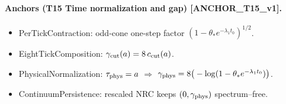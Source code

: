 \documentclass[11pt]{amsart}
\theoremstyle{plain}
\theoremstyle{definition}
\theoremstyle{remark}
\begin{document}
\paragraph{Anchors (T15 Time normalization and gap) [ANCHOR\_T15\_v1].}
\begin{itemize}
  \item PerTickContraction: odd-cone one-step factor $(1-\theta_* e^{-\lambda_1 t_0})^{1/2}$.
  \item EightTickComposition: $\gamma_{\rm cut}(a)=8\,c_{\rm cut}(a)$.
  \item PhysicalNormalization: $\tau_{\rm phys}=a$ $\Rightarrow$ $\gamma_{\rm phys}=8\big(-\log(1-\theta_* e^{-\lambda_1 t_0})\big)$.
  \item ContinuumPersistence: rescaled NRC keeps $(0,\gamma_{\rm phys})$ spectrum–free.
\end{itemize}
\end{document}
